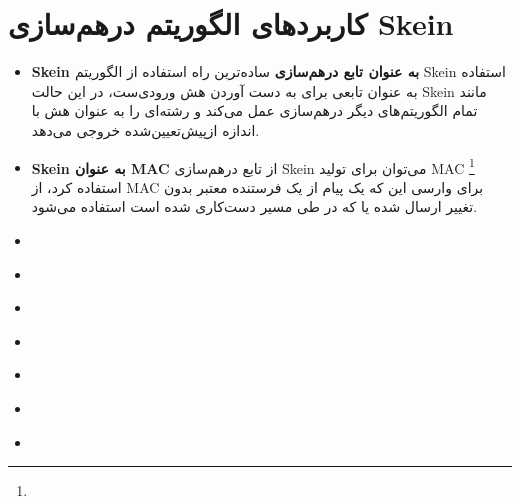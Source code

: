 \section{کاربردهای الگوریتم درهم‌سازی Skein}
\begin{itemize}

\item \textbf{Skein به عنوان تابع درهم‌سازی}
ساده‌ترین راه استفاده از الگوریتم Skein استفاده به عنوان تابعی برای به دست آوردن هش ورودی‌ست، در این حالت Skein مانند تمام الگوریتم‌های دیگر درهم‌سازی عمل می‌کند و رشته‌ای را به عنوان هش با اندازه ازپیش‌تعیین‌شده خروجی می‌دهد.
\item \textbf{Skein به عنوان MAC}
	از تابع درهم‌سازی Skein می‌توان برای تولید MAC
\footnote{}
استفاده کرد، از 
MAC 
برای وارسی این که یک پیام از یک فرستنده معتبر بدون تغییر ارسال شده یا که در طی مسیر دست‌کاری شده است استفاده می‌شود. 
\item {}
\item \textbf{}
\item \textbf{}
\item \textbf{}
\item \textbf{}
\item \textbf{}
\item \textbf{}
\end{itemize}
\begin{thebibliography}{1}


  

  


\end{thebibliography}
